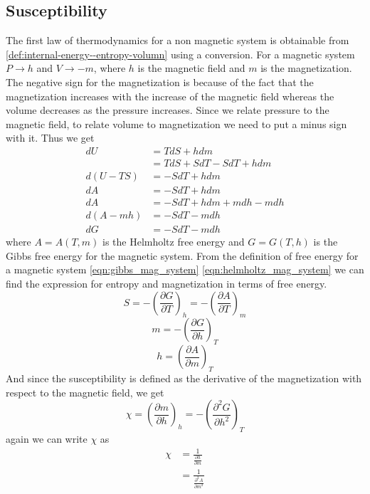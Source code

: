 	\subsection{Susceptibility}
	The first law of thermodynamics for a non magnetic system is obtainable from \ref{def:internal-energy--entropy-volumn} using a conversion.	For a magnetic system $P \rightarrow h$ and $V \rightarrow -m$, where $h$ is the magnetic field and $m$ is the magnetization. The negative sign for the magnetization is because of the fact that the magnetization increases with the increase of the magnetic field whereas the volume decreases as the pressure increases. Since we relate pressure to the magnetic field, to relate volume to magnetization we need to put a minus sign with it. Thus we get
	\begin{align}
		dU &= TdS + hdm \\
		   &= TdS + SdT - SdT + h dm \\
		d(U - TS)  &= -SdT + h dm \\
		dA &= -SdT + h dm \label{eqn:helmholtz_mag_system} \\
		dA &= -SdT + h dm + m dh -m dh \\
		d(A - mh) &= -SdT - m dh\\
		dG &= -SdT -m dh \label{eqn:gibbs_mag_system}
	\end{align} 
	where $A=A(T,m)$ is the  Helmholtz free energy and $G=G(T,h)$ is the Gibbs free energy for the magnetic system. From the definition of free energy for a magnetic system \ref{eqn:gibbs_mag_system} \ref{eqn:helmholtz_mag_system} we can find the expression for entropy and magnetization in terms of free energy.
	\begin{equation}
		S = -\left(\frac{\partial G}{\partial T}\right)_h = -\left(\frac{\partial A}{\partial T}\right)_m
	\end{equation}
	\begin{equation}
		m = -\left(\frac{\partial G}{\partial h}\right)_T
		\label{eqn:magnetization_def}
	\end{equation}
	\begin{equation}
		h = \left(\frac{\partial A}{\partial m}\right)_T
		\label{eqn:mag_field_def}
	\end{equation}	
	And since the susceptibility is defined as the derivative of the magnetization with respect to the magnetic field, we get
	\begin{equation}
		\chi = \left(\frac{\partial m}{\partial h}\right)_h = - \left(\frac{\partial^2G}{\partial h ^2}\right)_T
		\label{eqn:susceptibility_def}
	\end{equation}
	again we can write $\chi$ as
	\begin{align}
		\chi &= \frac{1}{\frac{\partial h}{\partial m}} \nonumber \\
			 &= \frac{1}{\frac{\partial^2 A}{\partial m ^2}} \label{eqn:susceptibility_def2}
	\end{align}
	
